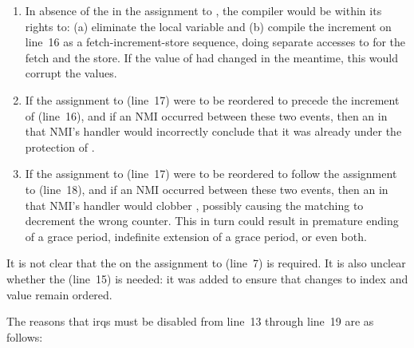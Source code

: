 \begin{enumerate}
\item	In absence of the  in the assignment
	to , the compiler would be within its rights
	to: (a) eliminate the local variable  and
	(b) compile the increment on line~16 as a
	fetch-increment-store sequence, doing separate accesses to
	 for the fetch and the
	store.
	If the value of  had
	changed in the meantime, this would corrupt the
	 values.
\item	If the assignment to 
	(line~17) were to be reordered to precede the increment
	of  (line~16), and if an
	NMI occurred between these two events, then an
	 in that NMI's handler
	would incorrectly conclude that it was already under the
	protection of .
\item	If the assignment to 
        (line~17) were to be reordered to follow the assignment
	to  (line~18), and if an
	NMI occurred between these two events, then an
	 in that NMI's handler
	would clobber , possibly
	causing the matching  to
	decrement the wrong counter.
	This in turn could result in premature ending of a
	grace period, indefinite extension of a grace period,
	or even both.
\end{enumerate}

It is not clear that the  on the assignment to
 (line~7) is required.
It is also unclear whether the 
(line~15) is needed: it was added to ensure that changes to index
and value remain ordered.

The reasons that irqs must be disabled from line~13 through
line~19 are as follows:

